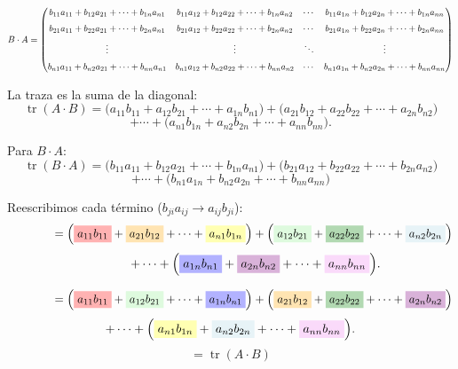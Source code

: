 \documentclass[a4paper,12pt]{article}
\begin{document}
\begin{ejercicio}[title=Ejercicio 7]
\[
\scalebox{0.75}{$
B\cdot A =
\begin{pmatrix}
b_{11}a_{11} + b_{12}a_{21} + \cdots + b_{1n}a_{n1} & 
b_{11}a_{12} + b_{12}a_{22} + \cdots + b_{1n}a_{n2} & 
\cdots & 
b_{11}a_{1n} + b_{12}a_{2n} + \cdots + b_{1n}a_{nn} \\[6pt]
b_{21}a_{11} + b_{22}a_{21} + \cdots + b_{2n}a_{n1} & 
b_{21}a_{12} + b_{22}a_{22} + \cdots + b_{2n}a_{n2} & 
\cdots & 
b_{21}a_{1n} + b_{22}a_{2n} + \cdots + b_{2n}a_{nn} \\[6pt]
\vdots & \vdots & \ddots & \vdots \\[6pt]
b_{n1}a_{11} + b_{n2}a_{21} + \cdots + b_{nn}a_{n1} & 
b_{n1}a_{12} + b_{n2}a_{22} + \cdots + b_{nn}a_{n2} & 
\cdots & 
b_{n1}a_{1n} + b_{n2}a_{2n} + \cdots + b_{nn}a_{nn}
\end{pmatrix}
$}
\]

La traza es la suma de la diagonal:
\[
\operatorname{tr}(A\cdot B)
=
\bigl(a_{11}b_{11} + a_{12}b_{21} + \cdots + a_{1n}b_{n1}\bigr)
+ \bigl(a_{21}b_{12} + a_{22}b_{22} + \cdots + a_{2n}b_{n2}\bigr)
\]
\[
+ \cdots +
\bigl(a_{n1}b_{1n} + a_{n2}b_{2n} + \cdots + a_{nn}b_{nn}\bigr).
\]

Para $B\cdot A$:
\[
\operatorname{tr}(B\cdot A)
=
\bigl(b_{11}a_{11} + b_{12}a_{21} + \cdots + b_{1n}a_{n1}\bigr)
+ \bigl(b_{21}a_{12} + b_{22}a_{22} + \cdots + b_{2n}a_{n2}\bigr)
\]
\[
+ \cdots +
\bigl(b_{n1}a_{1n} + b_{n2}a_{2n} + \cdots + b_{nn}a_{nn}\bigr)
\]
\vspace{0.2em}
\end{ejercicio}
\begin{ejercicio}[title=Ejercicio 7]
Reescribimos cada término ($b_{ji}a_{ij} \rightarrow a_{ij}b_{ji}$):
\[
\qquad\qquad=
\Bigl(
\colorbox{Red!30}{$a_{11}b_{11}$} +
\colorbox{Orange!30}{$a_{21}b_{12}$} +
\cdots +
\colorbox{Yellow!30}{$a_{n1}b_{1n}$}
\Bigr)
+
\Bigl(
\colorbox{LightGreen!30}{$a_{12}b_{21}$} +
\colorbox{Green!30}{$a_{22}b_{22}$} +
\cdots +
\colorbox{LightBlue!30}{$a_{n2}b_{2n}$}
\Bigr)
\]
\[
\qquad\qquad
+ \cdots +
\Bigl(
\colorbox{Blue!30}{$a_{1n}b_{n1}$} +
\colorbox{Purple!30}{$a_{2n}b_{n2}$} +
\cdots +
\colorbox{Violet!30}{$a_{nn}b_{nn}$}
\Bigr).
\]

\vspace{0.2em}

\[
\qquad\qquad=
\Bigl(
\colorbox{Red!30}{$a_{11}b_{11}$} +
\colorbox{LightGreen!30}{$a_{12}b_{21}$} +
\cdots +
\colorbox{Blue!30}{$a_{1n}b_{n1}$}
\Bigr)
+
\Bigl(
\colorbox{Orange!30}{$a_{21}b_{12}$} +
\colorbox{Green!30}{$a_{22}b_{22}$} +
\cdots +
\colorbox{Purple!30}{$a_{2n}b_{n2}$}
\Bigr)
\]
\[
+ \cdots +
\Bigl(
\colorbox{Yellow!30}{$a_{n1}b_{1n}$} +
\colorbox{LightBlue!30}{$a_{n2}b_{2n}$} +
\cdots +
\colorbox{Violet!30}{$a_{nn}b_{nn}$}
\Bigr).
\]
\[
= \boxed{\operatorname{tr}(A \cdot B)}
\]
\end{ejercicio}
\end{document}
